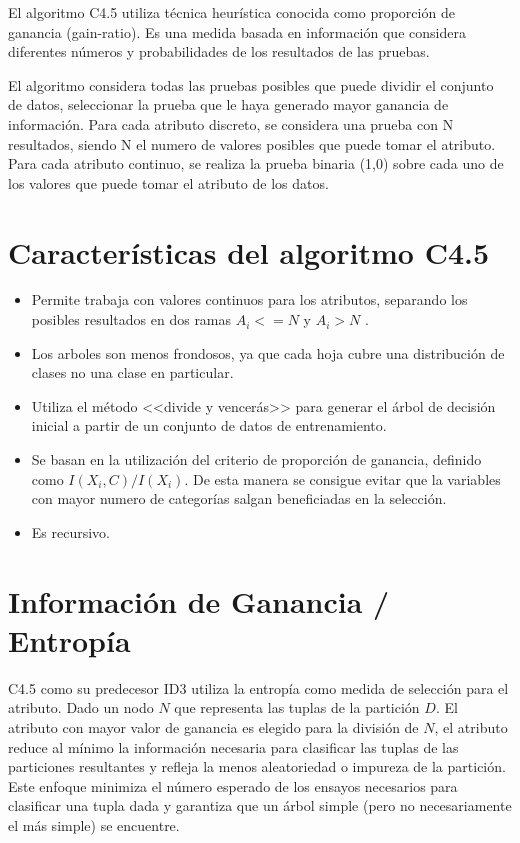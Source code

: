 El algoritmo C4.5 utiliza técnica heurística conocida como proporción
de ganancia (gain-ratio). Es una medida basada en información que
considera diferentes números y probabilidades de los resultados de
las pruebas.

El algoritmo considera todas las pruebas posibles que puede dividir
el conjunto de datos, seleccionar la prueba que le haya generado mayor
ganancia de información. Para cada atributo discreto, se considera
una prueba con N resultados, siendo N el numero de valores posibles
que puede tomar el atributo. Para cada atributo continuo, se realiza
la prueba binaria (1,0) sobre cada uno de los valores que puede tomar
el atributo de los datos.

\section{Características del algoritmo C4.5}
\begin{itemize}
\item Permite trabaja con valores continuos para los atributos, separando
los posibles resultados en dos ramas $A_{i}<=N$ y $A_{i}>N$ . 
\item Los arboles son menos frondosos, ya que cada hoja cubre una distribución
de clases no una clase en particular. 
\item Utiliza el método <<divide y vencerás>> para generar el árbol de
decisión inicial a partir de un conjunto de datos de entrenamiento. 
\item Se basan en la utilización del criterio de proporción de ganancia,
definido como $I(X_{i},C)/I(X_{i})$. De esta manera se consigue evitar
que la variables con mayor numero de categorías salgan beneficiadas
en la selección. 
\item Es recursivo. 
\end{itemize}

\section{Información de Ganancia / Entropía }

C4.5 como su predecesor ID3 utiliza la entropía como medida de selección
para el atributo. Dado un nodo $N$ que representa las tuplas de la
partición $D$. El atributo con mayor valor de ganancia es elegido
para la división de $N$, el atributo reduce al mínimo la información
necesaria para clasificar las tuplas de las particiones resultantes
y refleja la menos aleatoriedad o impureza de la partición. Este enfoque
minimiza el número esperado de los ensayos necesarios para clasificar
una tupla dada y garantiza que un árbol simple (pero no necesariamente
el más simple) se encuentre.

